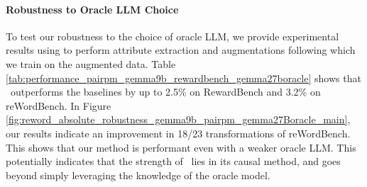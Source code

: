 \newpage

\vspace{-0.2in}
\paragraph{Robustness to Oracle LLM Choice} To test our robustness to the choice of oracle LLM, we provide experimental results using  to perform attribute extraction and augmentations following which we train \carma{} on the augmented data. Table \ref{tab:performance_pairpm_gemma9b_rewardbench_gemma27boracle} shows that \carma\ outperforms the baselines by up to 2.5\% on RewardBench and 3.2\% on reWordBench. 
In Figure \ref{fig:reword_absolute_robustness_gemma9b_pairpm_gemma27Boracle_main},
our results indicate an improvement in 18/23 transformations of reWordBench.
This shows that our method is performant even with a weaker oracle LLM. This potentially indicates that the strength of \carma\ lies in its causal method, and goes beyond simply leveraging the knowledge of the oracle model.

\begin{table}[!t]
    \centering
    \caption{\textbf{RM Performance with  as oracle}. Results on RewardBench and REwardBench with  as base model and  as oracle LLM used for attribute extraction and counterfactual augmentations. Results are in PairPM setting. \vspace{-0.1in}
    }
    \label{tab:performance_pairpm_gemma9b_rewardbench_gemma27boracle}
\end{table}

